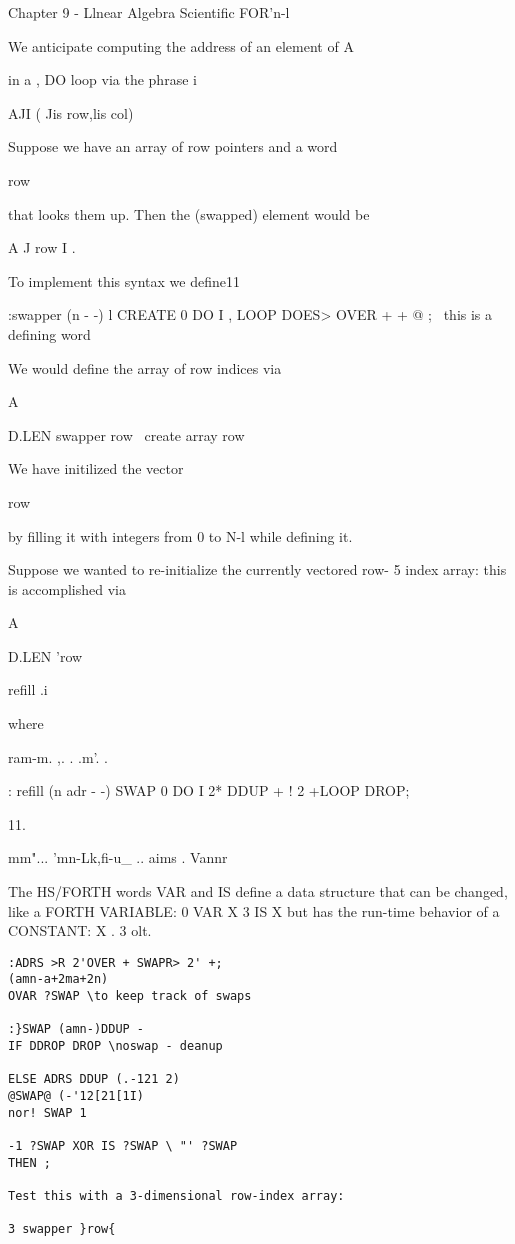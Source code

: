 {{{{Chapter 9 - Llnear Algebra Scientific FOR'n-l

We anticipate computing the address of an element of A{{ in a ,
DO loop via the phrase i

A{{JI}} ( Jis row,lis col)

Suppose we have an array of row pointers and a word }row{ that
looks them up. Then the (swapped) element would be

A{{ J }row{ I }}.

To implement this syntax we define11

:swapper (n - -) l
CREATE 0 DO I , LOOP
DOES> OVER + + @ ;
\ this is a defining word

 

 

We would define the array of row indices via

A{{ D.LEN swapper }row{ \ create array }row{

We have initilized the vector }row{ by filling it with integers
from 0 to N-l while defining it.

Suppose we wanted to re-initialize the currently vectored row- 5
index array: this is accomplished via

A{{ D.LEN '}row{ refill .i

where

ram-m. ,. . .m'. .

: refill (n adr - -)
SWAP 0 DO I 2* DDUP + !
2 +LOOP DROP;

 

11.

mm"... 'mn-Lk,fi-u\_ .. aims . Vannr

The HS/FORTH words VAR and IS define a data structure that can be changed, like a FORTH
VARIABLE: 0 VAR X 3 IS X but has the run-time behavior of a CONSTANT: X . 3 olt.



\begin{verbatim}
:ADRS >R 2'OVER + SWAPR> 2' +;
(amn-a+2ma+2n)
OVAR ?SWAP \to keep track of swaps

:}SWAP (amn-)DDUP -
IF DDROP DROP \noswap - deanup

ELSE ADRS DDUP (.-121 2)
@SWAP@ (-'12[21[1I)
nor! SWAP 1

-1 ?SWAP XOR IS ?SWAP \ "' ?SWAP
THEN ;

Test this with a 3-dimensional row-index array:

3 swapper }row{


\end{verbatim}}}}}}}}}}}
